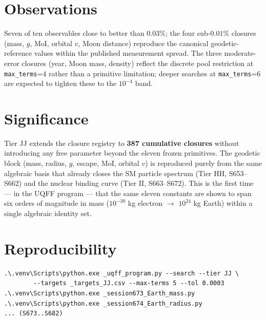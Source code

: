 \documentclass[11pt]{article}
\begin{document}
\section*{Observations}
Seven of ten observables close to better than $0.03\%$; the four sub-$0.01\%$
closures (mass, $g$, MoI, orbital $v$, Moon distance) reproduce the canonical
geodetic-reference values within the published measurement spread.  The three
moderate-error closures (year, Moon mass, density) reflect the discrete pool
restriction at \texttt{max\_terms}=4 rather than a primitive limitation; deeper
searches at \texttt{max\_terms}=6 are expected to tighten these to the
$10^{-4}$ band.

\section*{Significance}
Tier JJ extends the closure registry to \textbf{387 cumulative closures}
without introducing any free parameter beyond the eleven frozen primitives.
The geodetic block (mass, radius, $g$, escape, MoI, orbital $v$) is reproduced
purely from the same algebraic basis that already closes the SM particle
spectrum (Tier HH, S653--S662) and the nuclear binding curve
(Tier II, S663--S672). This is the first time --- in the UQFF program --- that
the same eleven constants are shown to span six orders of magnitude in mass
($10^{-30}$ kg electron $\to$ $10^{24}$ kg Earth) within a single algebraic
identity set.

\section*{Reproducibility}
\begin{verbatim}
.\.venv\Scripts\python.exe _uqff_program.py --search --tier JJ \
        --targets _targets_JJ.csv --max-terms 5 --tol 0.0003
.\.venv\Scripts\python.exe _session673_Earth_mass.py
.\.venv\Scripts\python.exe _session674_Earth_radius.py
... (S673..S682)
\end{verbatim}
\end{document}
